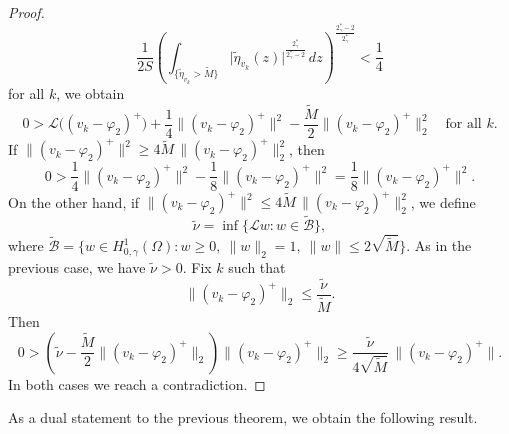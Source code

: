 \documentclass[11pt]{article}
\newcommand{\spacegr}{H^{1}_{0,\gamma}(\Omega)}
\begin{document}
\begin{proof}
\begin{equation*}
\frac{1}{2S}
\left(
\int_{\{ \tilde{\eta}_{v_k} > \tilde{M} \}}
\lvert \tilde{\eta}_{v_k}(z) \rvert^{\frac{2_{\gamma}^{\ast}}{2_{\gamma}^{\ast}-2}}\, dz
\right)^{\frac{2_{\gamma}^{\ast}-2}{2_{\gamma}^{\ast}}}
< \frac{1}{4}
\end{equation*}
for all $k$, we obtain
\begin{equation*}
0 >
\mathcal{L}\bigl( (v_k-\varphi_2)^{+} \bigr)
+ \frac{1}{4} \bigl\| (v_k-\varphi_2)^{+} \bigr\|^{2}
- \frac{\tilde{M}}{2} \bigl\| (v_k-\varphi_2)^{+} \bigr\|_{2}^{2}
\quad \text{for all } k .
\end{equation*}
If $\bigl\| (v_k-\varphi_2)^{+} \bigr\|^{2}
\ge 4\tilde{M}\, \bigl\| (v_k-\varphi_2)^{+} \bigr\|_{2}^{2}$, then 
\begin{equation*}
0 >
\frac{1}{4} \bigl\| (v_k-\varphi_2)^{+} \bigr\|^{2}
- \frac{1}{8} \bigl\| (v_k-\varphi_2)^{+} \bigr\|^{2}
= \frac{1}{8} \bigl\| (v_k-\varphi_2)^{+} \bigr\|^{2}.
\end{equation*}
On the other hand, if $\bigl\| (v_k-\varphi_2)^{+} \bigr\|^{2}
\le 4\tilde{M}\, \bigl\| (v_k-\varphi_2)^{+} \bigr\|_{2}^{2}$, we define
\begin{equation*}
\tilde{\nu} = \inf \{ \mathcal{L}w : w \in \tilde{\mathcal{B}} \},
\end{equation*}
where $\tilde{\mathcal{B}} = \{ w \in \spacegr : w \ge 0,\ \| w \|_{2} = 1,\ \| w \| \le 2\sqrt{\tilde{M}} \}$. As in the previous case, we have $\tilde{\nu} > 0$. Fix $k$ such that
\begin{equation*}
\bigl\| (v_k-\varphi_2)^{+} \bigr\|_{2} \le \frac{\tilde{\nu}}{\tilde{M}} .
\end{equation*}
Then
\begin{equation*}
0 >
\left(
\tilde{\nu} - \frac{\tilde{M}}{2} \bigl\| (v_k-\varphi_2)^{+} \bigr\|_{2}
\right)
\bigl\| (v_k-\varphi_2)^{+} \bigr\|_{2}
\ge
\frac{\tilde{\nu}}{4\sqrt{\tilde{M}}}\, \bigl\| (v_k-\varphi_2)^{+} \bigr\|.
\end{equation*}
In both cases we reach a contradiction. 
\end{proof}

As a dual statement to the previous theorem, we obtain the following result.
\end{document}
